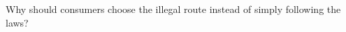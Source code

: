 \documentclass[preview]{standalone}
\begin{document}
\begin{center}
Why should consumers choose the illegal route instead of simply following the laws?
\end{center}
\end{document}
